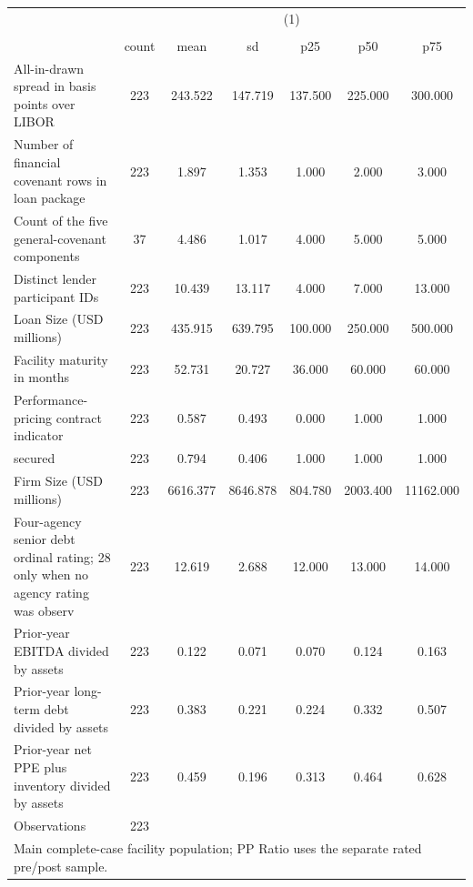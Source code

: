 {
\def\sym#1{\ifmmode^{#1}\else\(^{#1}\)\fi}
\begin{tabular}{l*{1}{cccccc}}
\hline\hline
                    &\multicolumn{6}{c}{(1)}                                                      \\
                    &\multicolumn{6}{c}{}                                                         \\
                    &       count&        mean&          sd&         p25&         p50&         p75\\
\hline
All-in-drawn spread in basis points over LIBOR&         223&     243.522&     147.719&     137.500&     225.000&     300.000\\
Number of financial covenant rows in loan package&         223&       1.897&       1.353&       1.000&       2.000&       3.000\\
Count of the five general-covenant components&          37&       4.486&       1.017&       4.000&       5.000&       5.000\\
Distinct lender participant IDs&         223&      10.439&      13.117&       4.000&       7.000&      13.000\\
Loan Size (USD millions)&         223&     435.915&     639.795&     100.000&     250.000&     500.000\\
Facility maturity in months&         223&      52.731&      20.727&      36.000&      60.000&      60.000\\
Performance-pricing contract indicator&         223&       0.587&       0.493&       0.000&       1.000&       1.000\\
secured             &         223&       0.794&       0.406&       1.000&       1.000&       1.000\\
Firm Size (USD millions)&         223&    6616.377&    8646.878&     804.780&    2003.400&   11162.000\\
Four-agency senior debt ordinal rating; 28 only when no agency rating was observ&         223&      12.619&       2.688&      12.000&      13.000&      14.000\\
Prior-year EBITDA divided by assets&         223&       0.122&       0.071&       0.070&       0.124&       0.163\\
Prior-year long-term debt divided by assets&         223&       0.383&       0.221&       0.224&       0.332&       0.507\\
Prior-year net PPE plus inventory divided by assets&         223&       0.459&       0.196&       0.313&       0.464&       0.628\\
\hline
Observations        &         223&            &            &            &            &            \\
\hline\hline
\multicolumn{7}{l}{\footnotesize Main complete-case facility population; PP Ratio uses the separate rated pre/post sample.}\\
\end{tabular}
}
